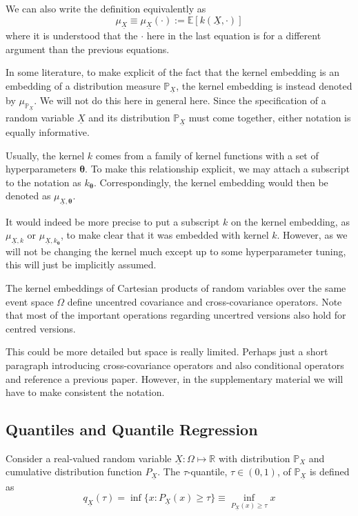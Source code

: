 \documentclass[twoside]{article} \usepackage{aistats2017}
\theoremstyle{definition}
\theoremstyle{remark}
\newcommand{\rv}[1]{\underline{#1}}
\newcommand{\warn}[1]{{\color{RedOrange} #1}}
\newcommand{\extra}[1]{{\color{ForestGreen} #1}}
\begin{document}
		We can also write the definition equivalently as
		\begin{equation}
			\mu_{\rv{X}} \equiv \mu_{\rv{X}}(\cdot) := \mathbb{E}[k(\rv{X}, \cdot)]
		\label{eq:basic_embedding_alternative}
		\end{equation}
		\extra{where it is understood that the $\cdot$ here in the last equation is for a different argument than the previous equations.}
		 
		\extra{In some literature, to make explicit of the fact that the kernel embedding is an embedding of a distribution measure $\mathbb{P}_{\rv{X}}$, the kernel embedding is instead denoted by $\mu_{\mathbb{P}_{\rv{X}}}$. We will not do this here in general here. Since the specification of a random variable $\rv{X}$ and its distribution $\mathbb{P}_{\rv{X}}$ must come together, either notation is equally informative.}
		 
		Usually, the kernel $k$ comes from a family of kernel functions with a set of hyperparameters $\bm{\theta}$. To make this relationship explicit, we may attach a subscript to the notation as $k_{\bm{\theta}}$. Correspondingly, the kernel embedding would then be denoted as $\mu_{\rv{X}, \bm{\theta}}$.

		\extra{It would indeed be more precise to put a subscript $k$ on the kernel embedding, as $\mu_{\rv{X}, k}$ or $\mu_{\rv{X}, k_{\bm{\theta}}}$, to make clear that it was embedded with kernel $k$. However, as we will not be changing the kernel much except up to some hyperparameter tuning, this will just be implicitly assumed.}
			 
		\extra{The kernel embeddings of Cartesian products of random variables over the same event space $\Omega$ define uncentred covariance and cross-covariance operators. Note that most of the important operations regarding uncertred versions also hold for centred versions.}
		 
		\warn{This could be more detailed but space is really limited. Perhaps just a short paragraph introducing cross-covariance operators and also conditional operators and reference a previous paper. However, in the supplementary material we will have to make consistent the notation.}

		
	\subsection{Quantiles and Quantile Regression}
	\label{sec:background:quantiles}

		Consider a real-valued random variable $\rv{X} : \Omega \mapsto \mathbb{R}$ with distribution $\mathbb{P}_{X}$ and cumulative distribution function $P_{\rv{X}}$. The $\tau$-quantile, $\tau \in (0, 1)$, of $\mathbb{P}_{\rv{X}}$ is defined as
		\begin{equation}
			q_{\rv{X}}(\tau) = \inf\{x : P_{\rv{X}}(x) \geq \tau\} \equiv \inf_{P_{\rv{X}}(x) \geq \tau} x
		\label{eq:quantile}
		\end{equation}
		
\end{document}
